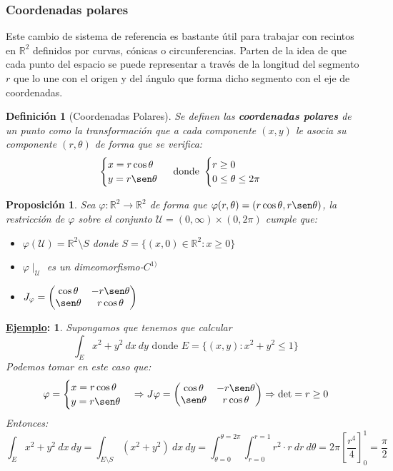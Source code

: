 \documentclass[10pt,a4paper,openright]{book}
\theoremstyle{break}
\newtheorem*{defi}{Definición}
\newtheorem*{prop}{Proposición}
\newtheorem*{ej}{\underline{Ejemplo}:}
\newcommand{\dif}[1]{\ d#1}
\begin{document}
\subsubsection*{Coordenadas polares}
Este cambio de sistema de referencia es bastante útil para trabajar con recintos en $\mathbb{R}^2$ definidos por curvas, cónicas o circunferencias. Parten de la idea de que cada punto del espacio se puede representar a través de la longitud del segmento $r$ que lo une con el origen y del ángulo que forma dicho segmento con el eje de coordenadas.

\begin{defi}[Coordenadas Polares]
Se definen las \textbf{coordenadas polares} de un punto como la transformación que a cada componente $(x,y)$ le asocia su componente $(r, \theta)$ de forma que se verifica:
$$\begin{cases} x = r \cos \theta \\ y = r \sen \theta \end{cases} \mbox{ donde } \begin{cases} r \ge 0\\ 0 \le \theta \le 2\pi \end{cases}$$
\end{defi}

\begin{prop}
Sea $\varphi: \mathbb{R}^2\rightarrow  \mathbb{R}^2$ de forma que $\varphi(r, \theta) = (r\cos\theta, r\sen\theta)$, la restricción de $\varphi$ sobre el conjunto $\mathcal{U} = (0,\infty)\times (0, 2\pi)$ cumple que:
\begin{itemize}
\item $\varphi(\mathcal{U}) = \mathbb{R}^2\setminus{S}$ donde $S = \{(x,0)\in \mathbb{R}^2: x\geq 0\}$
\item $\varphi\mid_\mathcal{U}$ es un dimeomorfismo-$C^{1)}$
\item $J_\varphi = \begin{pmatrix}\cos \theta & -r\sen \theta \\ \sen \theta & r\cos \theta\end{pmatrix}$
\end{itemize}
\end{prop}

\begin{ej}
Supongamos que tenemos que calcular
$$\int_E x^2 + y^2 \dif{x}\dif{y} \mbox{ donde } E = \{\left(x, y\right): x^2 + y^2 \le 1\}$$
Podemos tomar en este caso que:
$$\varphi = \begin{cases} x = r\cos \theta \\ y = r\sen\theta \end{cases} \Rightarrow J\varphi = \begin{pmatrix} \cos \theta & -r\sen \theta \\ \sen \theta & r\cos \theta \end{pmatrix} \Rightarrow \det = r \ge 0$$
Entonces:
$$\int_E x^2 + y^2 \dif{x} \dif{y} = \int_{E\setminus S} \left(x^2 + y^2\right) \dif{x} \dif{y} = \int_{\theta = 0}^{\theta = 2\pi} \int_{r = 0}^{r = 1} r^2 \cdot r \dif{r} \dif{\theta} = 2\pi \left[\frac{r^4}{4}\right]_0^1 = \frac{\pi}{2} $$
\end{ej}
\end{document}
